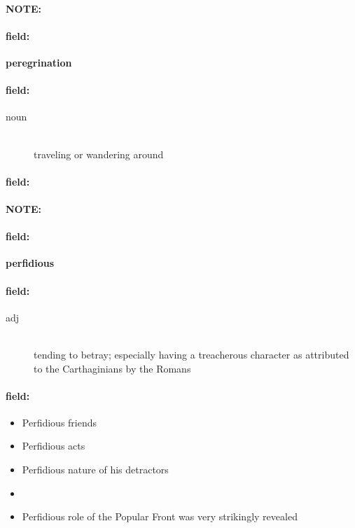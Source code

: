 \documentclass[12pt]{article}
\newenvironment{note}{\paragraph{NOTE:}}{}
\newenvironment{field}{\paragraph{field:}}{}
\begin{document}
\begin{note}
\begin{field}
\textbf{\large peregrination}
\end{field}


\begin{field}
\begin{description}
\item[noun] \hfill \\ 
traveling or wandering around

\end{description}
\end{field}

\begin{field}
\end{field}
\end{note}
\begin{note}
\begin{field}
\textbf{\large perfidious}
\end{field}


\begin{field}
\begin{description}
\item[adj] \hfill \\ 
tending to betray; especially having a treacherous character as attributed to the Carthaginians by the Romans

\end{description}
\end{field}

\begin{field}
\begin{itemize}
\item Perfidious friends
\item Perfidious acts
\item Perfidious nature of his detractors
\item 
\item Perfidious role of the Popular Front was very strikingly revealed
\end{itemize}
\end{field}
\end{note}
\end{document}
